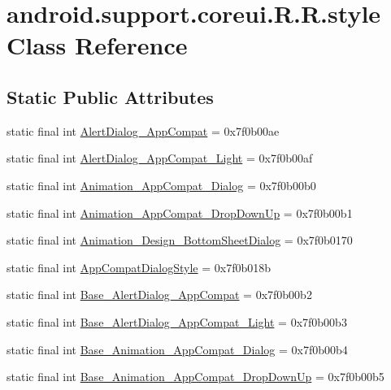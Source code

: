 \hypertarget{classandroid_1_1support_1_1coreui_1_1_r_1_1style}{
\section{android.support.coreui.R.R.style Class Reference}
\label{classandroid_1_1support_1_1coreui_1_1_r_1_1style}
}
\subsection*{Static Public Attributes}
\begin{CompactItemize}
\item 
static final int \hyperlink{classandroid_1_1support_1_1coreui_1_1_r_1_1style_154aee67407fc74f9d71384a80ef0250}{AlertDialog\_\-AppCompat} = 0x7f0b00ae
\item 
static final int \hyperlink{classandroid_1_1support_1_1coreui_1_1_r_1_1style_2f4c6b9abf06f40a1bebf243d811412d}{AlertDialog\_\-AppCompat\_\-Light} = 0x7f0b00af
\item 
static final int \hyperlink{classandroid_1_1support_1_1coreui_1_1_r_1_1style_1be06a4127986e302b8e89e63e1af727}{Animation\_\-AppCompat\_\-Dialog} = 0x7f0b00b0
\item 
static final int \hyperlink{classandroid_1_1support_1_1coreui_1_1_r_1_1style_72252692ffc360a0a86ade7a2f971878}{Animation\_\-AppCompat\_\-DropDownUp} = 0x7f0b00b1
\item 
static final int \hyperlink{classandroid_1_1support_1_1coreui_1_1_r_1_1style_ddc88c915bd7336b247f36f9c326afa7}{Animation\_\-Design\_\-BottomSheetDialog} = 0x7f0b0170
\item 
static final int \hyperlink{classandroid_1_1support_1_1coreui_1_1_r_1_1style_3c09cf9fa136df69bdb900d0e5d59132}{AppCompatDialogStyle} = 0x7f0b018b
\item 
static final int \hyperlink{classandroid_1_1support_1_1coreui_1_1_r_1_1style_4b555ac6b2e83b989386468d8a3663d8}{Base\_\-AlertDialog\_\-AppCompat} = 0x7f0b00b2
\item 
static final int \hyperlink{classandroid_1_1support_1_1coreui_1_1_r_1_1style_b5eb9e9c3136664b965abb9e80796bd6}{Base\_\-AlertDialog\_\-AppCompat\_\-Light} = 0x7f0b00b3
\item 
static final int \hyperlink{classandroid_1_1support_1_1coreui_1_1_r_1_1style_aceb911cd0190493a4a57f19db97c84f}{Base\_\-Animation\_\-AppCompat\_\-Dialog} = 0x7f0b00b4
\item 
static final int \hyperlink{classandroid_1_1support_1_1coreui_1_1_r_1_1style_88a7ecde4a4170a3a39c6d2682f00f8e}{Base\_\-Animation\_\-AppCompat\_\-DropDownUp} = 0x7f0b00b5

\end{CompactItemize}
